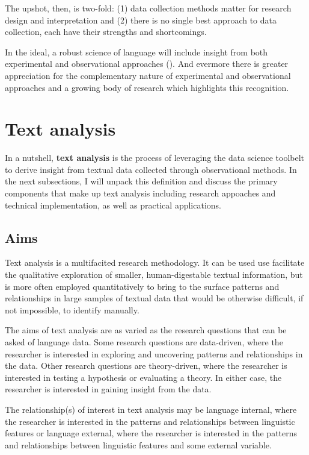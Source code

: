 \documentclass[
  letterpaper,
]{latex/krantz}
\theoremstyle{definition}
\theoremstyle{remark}
\begin{document}
The upshot, then, is two-fold: (1) data collection methods matter for
research design and interpretation and (2) there is no single best
approach to data collection, each have their strengths and shortcomings.

In the ideal, a robust science of language will include insight from
both experimental and observational approaches
(). And evermore there
is greater appreciation for the complementary nature of experimental and
observational approaches and a growing body of research which highlights
this recognition.

\section{Text analysis}\label{text-analysis}

In a nutshell, \textbf{text analysis} is the
process of leveraging the data science toolbelt to derive insight from
textual data collected through observational methods. In the next
subsections, I will unpack this definition and discuss the primary
components that make up text analysis including research appoaches and
technical implementation, as well as practical applications.

\subsection{Aims}\label{aims}

Text analysis is a multifacited research methodology. It can be used use
facilitate the qualitative exploration of smaller, human-digestable
textual information, but is more often employed quantitatively to bring
to the surface patterns and relationships in large samples of textual
data that would be otherwise difficult, if not impossible, to identify
manually.

The aims of text analysis are as varied as the research questions that
can be asked of language data. Some research questions are data-driven,
where the researcher is interested in exploring and uncovering patterns
and relationships in the data. Other research questions are
theory-driven, where the researcher is interested in testing a
hypothesis or evaluating a theory. In either case, the researcher is
interested in gaining insight from the data.

The relationship(s) of interest in text analysis may be language
internal, where the researcher is interested in the patterns and
relationships between linguistic features or language external, where
the researcher is interested in the patterns and relationships between
linguistic features and some external variable.
\end{document}
